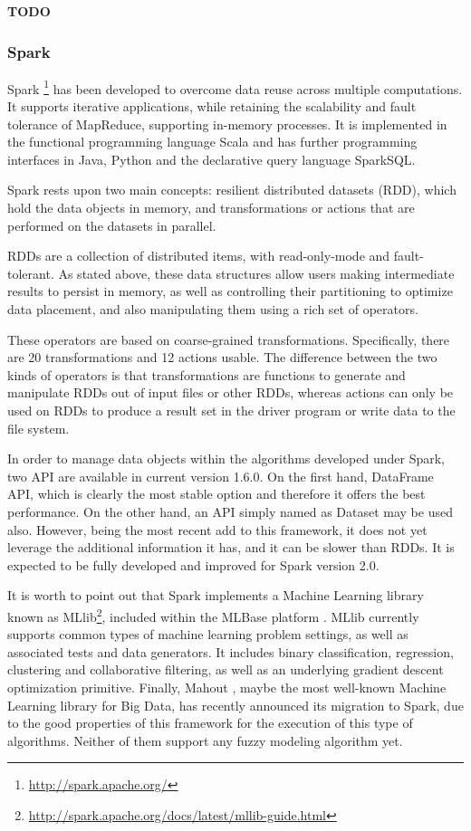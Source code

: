 \documentclass[3p,review]{elsarticle}
\newcommand{\TODO}{\textbf{TODO}}
\begin{document}
\TODO

\subsubsection{Spark}\label{subsec:spark}

Spark\cite{Zaharia12,Zaharia10} \footnote{\url{http://spark.apache.org/}} has been developed to overcome data reuse across multiple computations. It supports iterative applications, while retaining the scalability and fault tolerance of MapReduce, supporting in-memory processes. It is implemented in the functional programming language Scala and has further programming interfaces in Java, Python and the declarative query language SparkSQL.

Spark rests upon two main concepts: resilient distributed datasets (RDD), which hold the data objects in memory, and transformations or actions that are performed on the datasets in parallel.

RDDs are a collection of distributed items, with read-only-mode and fault-tolerant. As stated above, these data structures allow users making intermediate results to persist in memory, as well as controlling their partitioning to optimize data placement, and also manipulating them using a rich set of operators.

These operators are based on coarse-grained transformations. Specifically, there are 20 transformations and 12 actions usable. The difference between the two kinds of operators is that transformations are functions to generate and manipulate RDDs out of input files or other RDDs, whereas actions can only be used on RDDs to produce a result set in the driver program or write data to the file system\cite{Zaharia12}.

In order to manage data objects within the algorithms developed under Spark, two API are available in current version 1.6.0. On the first hand, DataFrame API, which is clearly the most stable option and therefore it offers the best performance. On the other hand, an API simply named as Dataset may be used also. However, being the most recent add to this framework, it does not yet leverage the additional information it has, and it can be slower than RDDs. It is expected to be fully developed and improved for Spark version 2.0.

It is worth to point out that Spark implements a Machine Learning library known as MLlib\footnote{\url{http://spark.apache.org/docs/latest/mllib-guide.html}}, included within the MLBase platform \cite{Kra13}. MLlib currently supports common types of machine learning problem settings, as well as associated tests and data generators. It includes binary classification, regression, clustering and collaborative filtering, as well as an underlying gradient descent optimization primitive. Finally, Mahout \cite{Owe11}, maybe the most well-known Machine Learning library for Big Data, has recently announced its migration to Spark, due to the good properties of this framework for the execution of this type of algorithms. Neither of them support any fuzzy modeling algorithm yet.
\end{document}
